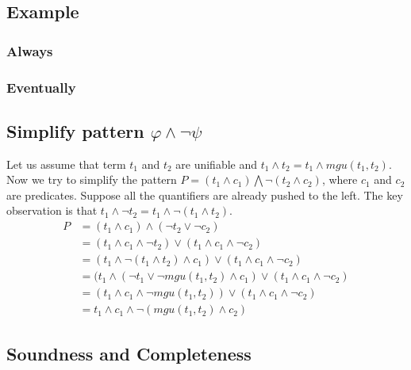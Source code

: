 \documentclass{article}
\begin{document}
\subsection{Example}
\subsubsection{Always}

\subsubsection{Eventually}

\subsection{Simplify pattern $\varphi \wedge \neg \psi$}
Let us assume that term $t_1$ and $t_2$ are unifiable and $t_1 \wedge t_2 = t_1 \wedge mgu(t_1, t_2)$.
Now we try to simplify the pattern $P = (t_1 \wedge c_1) \bigwedge \neg(t_2 \wedge c_2)$, where $c_1$ and $c_2$ are predicates.
Suppose all the quantifiers are already pushed to the left.
The key observation is that $t_1 \wedge \neg t_2 = t_1 \wedge \neg(t_1 \wedge t_2)$.
\begin{align*}
P &= (t_1 \wedge c_1) \wedge (\neg t_2 \vee \neg c_2) \\
  &= (t_1 \wedge c_1 \wedge \neg t_2) \vee (t_1 \wedge c_1 \wedge \neg c_2) \\
  &= (t_1 \wedge \neg(t_1 \wedge t_2) \wedge c_1) \vee (t_1 \wedge c_1 \wedge \neg c_2) \\
  &= (t_1 \wedge (\neg t_1 \vee \neg mgu(t_1, t_2) \wedge c_1) \vee (t_1 \wedge c_1 \wedge \neg c_2) \\
  &= (t_1 \wedge c_1 \wedge \neg mgu(t_1, t_2)) \vee (t_1 \wedge c_1 \wedge \neg c_2) \\
  &= t_1 \wedge c_1 \wedge \neg (mgu(t_1, t_2) \wedge c_2)
\end{align*}


\subsection{Soundness and Completeness}
\end{document}
